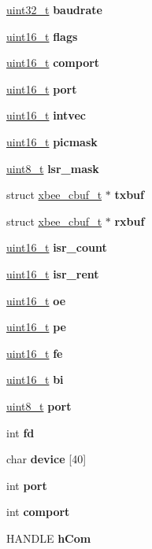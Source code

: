 \begin{DoxyCompactItemize}
\item 
\hyperlink{group__hal__dos_ga09a1e304d66d35dd47daffee9731edaa}{uint32\+\_\+t} {\bfseries baudrate}
\item 
\hyperlink{group__hal__dos_ga5a8b2dc9e45a9ee81a94ef304fb62505}{uint16\+\_\+t} {\bfseries flags}
\item 
\hyperlink{group__hal__dos_ga5a8b2dc9e45a9ee81a94ef304fb62505}{uint16\+\_\+t} {\bfseries comport}
\item 
\hyperlink{group__hal__dos_ga5a8b2dc9e45a9ee81a94ef304fb62505}{uint16\+\_\+t} {\bfseries port}
\item 
\hyperlink{group__hal__dos_ga5a8b2dc9e45a9ee81a94ef304fb62505}{uint16\+\_\+t} {\bfseries intvec}
\item 
\hyperlink{group__hal__dos_ga5a8b2dc9e45a9ee81a94ef304fb62505}{uint16\+\_\+t} {\bfseries picmask}
\item 
\hyperlink{group__hal__dos_gae1affc9ca37cfb624959c866a73f83c2}{uint8\+\_\+t} {\bfseries lsr\+\_\+mask}
\item 
struct \hyperlink{structxbee__cbuf__t}{xbee\+\_\+cbuf\+\_\+t} $\ast$ {\bfseries txbuf}
\item 
struct \hyperlink{structxbee__cbuf__t}{xbee\+\_\+cbuf\+\_\+t} $\ast$ {\bfseries rxbuf}
\item 
\hyperlink{group__hal__dos_ga5a8b2dc9e45a9ee81a94ef304fb62505}{uint16\+\_\+t} {\bfseries isr\+\_\+count}
\item 
\hyperlink{group__hal__dos_ga5a8b2dc9e45a9ee81a94ef304fb62505}{uint16\+\_\+t} {\bfseries isr\+\_\+rent}
\item 
\hyperlink{group__hal__dos_ga5a8b2dc9e45a9ee81a94ef304fb62505}{uint16\+\_\+t} {\bfseries oe}
\item 
\hyperlink{group__hal__dos_ga5a8b2dc9e45a9ee81a94ef304fb62505}{uint16\+\_\+t} {\bfseries pe}
\item 
\hyperlink{group__hal__dos_ga5a8b2dc9e45a9ee81a94ef304fb62505}{uint16\+\_\+t} {\bfseries fe}
\item 
\hyperlink{group__hal__dos_ga5a8b2dc9e45a9ee81a94ef304fb62505}{uint16\+\_\+t} {\bfseries bi}
\item 
\hyperlink{group__hal__dos_gae1affc9ca37cfb624959c866a73f83c2}{uint8\+\_\+t} {\bfseries port}
\item 
int {\bfseries fd}
\item 
char {\bfseries device} \mbox{[}40\mbox{]}
\item 
\mbox{\label{structxbee__serial__t_a63c89c04d1feae07ca35558055155ffb}} 
int {\bfseries port}
\item 
int {\bfseries comport}
\item 
H\+A\+N\+D\+LE {\bfseries h\+Com}
\end{DoxyCompactItemize}


